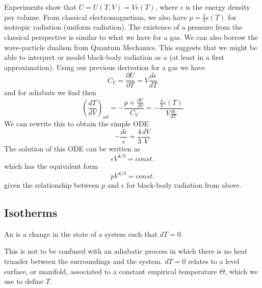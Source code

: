 \documentclass[12pt, a4paper, oneside, openright, titlepage]{book}
\begin{document}
\begin{eg}
\begin{center}
\begin{tikzpicture}[x=0.75pt,y=0.75pt,yscale=-1,xscale=1]
\end{tikzpicture}
    \end{center}
    Experiments show that $U = U(T,V) = V\epsilon(T)$, where $\epsilon$ is the energy density per volume. From classical electromagnetism, we also have $p = \frac{1}{3}\epsilon(T)$ for isotropic radiation (uniform radiation). The existence of a pressure from the classical perspective is similar to what we have for a gas. We can also borrow the wave-particle dualism from Quantum Mechanics. This suggests that we might be able to interpret or model black-body radiation as a  (at least in a first approximation). Using our previous derivation for a gas we have \begin{equation*}
        C_V = \frac{\partial U}{\partial T} = V\frac{d\epsilon}{dT}
    \end{equation*}
    and for adiabats we find then \begin{equation*}
        \left(\frac{dT}{dV}\right)_{ad} = -\frac{p + \frac{\partial U}{\partial V}}{C_V} = -\frac{\frac{4}{3}\epsilon(T)}{V\frac{d\epsilon}{dT}}
    \end{equation*}
    We can rewrite this to obtain the simple ODE \begin{equation*}
        -\frac{d\epsilon}{\epsilon} = \frac{4}{3}\frac{dV}{V}
    \end{equation*}
    The solution of this ODE can be written as \begin{equation*}
        \epsilon V^{4/3} = const.
    \end{equation*}
    which has the equivalent form \begin{equation*}
        pV^{4/3} = const.
    \end{equation*}
    given the relationship between $p$ and $\epsilon$ for black-body radiation from above.
\end{eg}


\subsection{Isotherms}

\begin{defn}
    An  is a change in the state of a system such that $dT = 0$.
\end{defn}

This is not to be confused with an adiabatic process in which there is no heat trnasfer between the surroundings and the system. $dT = 0$ relates to a level surface, or manifold, associated to a constant empirical temperature $\Theta$, which we use to define $T$.
\end{document}

